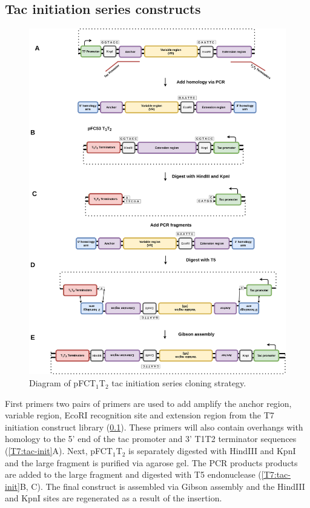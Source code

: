 \documentclass[11pt]{article}
\begin{document}
\subsection{Tac initiation series constructs}
\label{sec:tac-init}

\begin{figure}[H]
	\includegraphics[width=15cm]{images/cloning_diagrams/construct_diagrams-Tac-initiation-series.png}
	\centering
	\caption{Diagram of pFCT$_1$T$_2$ tac initiation series cloning strategy.}
\end{figure}

First primers two pairs of primers are used to add amplify the anchor region, variable region, EcoRI recognition site and extension region from the T7 initiation construct library (\ref{sec:tac-init}). These primers will also contain overhangs with homology to the 5' end of the tac promoter and 3' T1T2 terminator sequences (\ref{T7:tac-init}A). Next, pFCT$_1$T$_2$ is separately digested with HindIII and KpnI and the large fragment is purified via agarose gel. The PCR products products are added to the large fragment and digested with T5 endonuclease (\ref{T7:tac-init}B, C). The final construct is assembled via Gibson assembly and the HindIII and KpnI sites are regenerated as a result of the insertion. 
\end{document}
